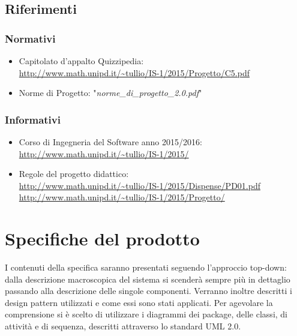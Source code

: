 \documentclass[a4paper,11pt]{article}
\begin{document}
	\subsection{Riferimenti}
		\subsubsection{Normativi}
		\begin{itemize}
			\item Capitolato d'appalto Quizzipedia:\\
			\url{http://www.math.unipd.it/~tullio/IS-1/2015/Progetto/C5.pdf}
			\item Norme di Progetto: "\textit{norme\_di\_progetto\_2.0.pdf}"
		\end{itemize}
		\subsubsection{Informativi}
		\begin{itemize}
			\item Corso di Ingegneria del Software anno 2015/2016:\\
			\url{http://www.math.unipd.it/~tullio/IS-1/2015/}
			\item Regole del progetto didattico:\\
			\url{http://www.math.unipd.it/~tullio/IS-1/2015/Dispense/PD01.pdf}
			\url{http://www.math.unipd.it/~tullio/IS-1/2015/Progetto/}\\
			\end{itemize}
	\pagebreak
	\newpage
	\section{Specifiche del prodotto}
	I contenuti della specifica saranno presentati seguendo l'approccio top-down: dalla descrizione macroscopica del sistema si scenderà sempre più in dettaglio passando alla descrizione delle singole componenti. Verranno inoltre descritti i design pattern utilizzati e come essi sono stati applicati. Per agevolare la comprensione si è scelto di utilizzare i diagrammi dei package, delle classi, di attività e di sequenza, descritti attraverso lo standard UML 2.0.
	
\end{document}
